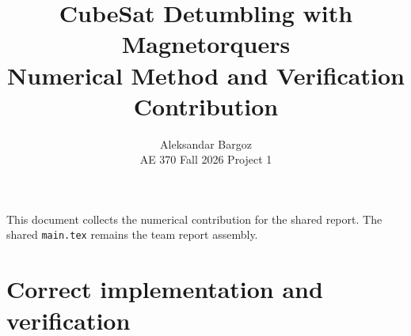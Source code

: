 \documentclass[11pt]{article}
\title{CubeSat Detumbling with Magnetorquers\\Numerical Method and Verification Contribution}
\author{Aleksandar Bargoz\\AE 370 Fall 2026 Project 1}
\date{}
\begin{document}
\maketitle
This document collects the numerical contribution for the shared report.
The shared \texttt{main.tex} remains the team report assembly.

\section{Correct implementation and verification}









\end{document}
